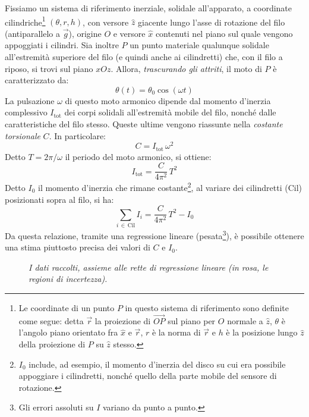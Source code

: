 \documentclass{article}
\begin{document}
Fissiamo un sistema di riferimento inerziale, solidale all'apparato,
a coordinate cilindriche\footnote{
    Le coordinate di un punto $P$ in questo sistema di riferimento sono
    definite come segue: detta $\vec{r}$ la proiezione di $\overrightarrow{OP}$
    sul piano per $O$ normale a $\hat{z}$,
    $\theta$ è l'angolo piano orientato fra $\hat{x}$ e $\vec{r}$,
    $r$ è la norma di $\vec{r}$ e
    $h$ è la posizione lungo $\hat{z}$ della proiezione di $P$ su
    $\hat{z}$ stesso.
} $(\theta, r, h)$, con versore $\hat{z}$ giacente
lungo l'asse di rotazione del filo (antiparallelo a $\vec{g}$),
origine $O$ e versore $\hat{x}$ contenuti nel piano sul quale vengono appoggiati
i cilindri. Sia inoltre $P$ un punto materiale qualunque solidale all'estremità
superiore del filo (e quindi anche ai cilindretti) che, con il filo a riposo,
si trovi sul piano $xOz$.
Allora, \emph{trascurando gli attriti}, il moto di $P$ è caratterizzato da:
\[\theta(t) = \theta_0 \cos(\omega t)\]
La pulsazione $\omega$ di questo moto armonico dipende dal momento d'inerzia
complessivo $I_\text{tot}$ dei corpi solidali all'estremità mobile del filo,
nonché dalle caratteristiche del filo stesso. Queste ultime vengono riassunte
nella \emph{costante torsionale} $C$. In particolare:
\[ C = I_\text{tot}\,\omega^2 \]
Detto $T = 2\pi / \omega$ il periodo del moto armonico, si ottiene:
\[ I_\text{tot} = \frac{C}{4\pi^2}\,T^2 \]
Detto $I_0$ il momento d'inerzia che rimane costante\footnote{
    $I_0$ include, ad esempio, il momento d'inerzia del disco su cui
    era possibile appoggiare i cilindretti, nonché quello della parte mobile
    del sensore di rotazione.
},
al variare dei cilindretti ($\text{Cil}$) posizionati sopra al filo, si ha:
\[ \sum_{i\,\in\,\text{Cil}}\!\!I_i = \frac{C}{4\pi^2}\,T^2 - I_0 \]
Da questa relazione, tramite una regressione lineare (pesata\footnote{
    Gli errori assoluti su $I$ variano da punto a punto.
}), è possibile
ottenere una stima piuttosto precisa dei valori di $C$ e $I_0$.

\begin{center}
    \begin{figure}[H]
        \caption{\emph{
            I dati raccolti, assieme alle rette di regressione lineare
            (in rosa, le regioni di incertezza).
        }}
    \end{figure}
\end{center}
\end{document}
